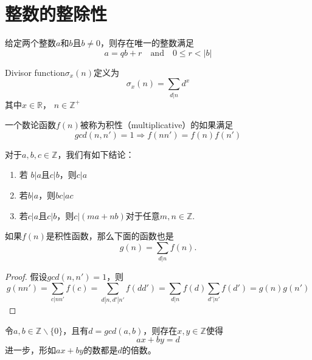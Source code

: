 \section{整数的整除性}
\begin{definition}
	给定两个整数$a$和$b$且$b\neq 0$，则存在唯一的整数满足
	\begin{equation*}
		a = qb+r\quad\text{and}\quad 0\leq r< |b|
	\end{equation*}
\end{definition}
\begin{definition}
	Divisor function$\sigma_x(n)$定义为
	\begin{equation*}
		\sigma_x(n) = \sum\limits_{d|n}d^x
	\end{equation*}
	其中$x\in \mathbb{R}$， $n\in \mathbb Z^+$
\end{definition}
\begin{definition}
	一个数论函数$f(n)$被称为积性（multiplicative）的如果满足
	\begin{equation*}
		gcd(n, n') = 1\Rightarrow f(nn') = f(n)f(n')
	\end{equation*}
\end{definition}
\begin{proposition}
	对于$a, b, c\in \mathbb Z$，我们有如下结论：
	\begin{enumerate}
		\item 若 $b|a$且$c|b$，则$c|a$
		\item 若$b|a$，则$bc|ac$
		\item 若$c|a$且$c|b$，则$c|(ma+nb)$对于任意$m, n\in \mathbb{Z}$.
	\end{enumerate}
\end{proposition}
\begin{proposition}
	如果$f(n)$是积性函数，那么下面的函数也是
	\begin{equation*}
		g(n) = \sum_{d|n}f(n).
	\end{equation*}
\end{proposition}
\begin{proof}
	假设$gcd(n, n')=1$，则
	\begin{equation*}
		g(nn') = \sum_{c|nn'}f(c) = \sum_{d|n, d'|n'}f(dd') = \sum_{d|n}f(d)\sum_{d'|n'}f(d') = g(n)g(n')
	\end{equation*}
\end{proof}
\begin{theorem}[裴蜀定理]
	令$a, b\in \mathbb{Z}\backslash\{0\}$，且有$d = gcd(a, b)$，则存在$x, y\in \mathbb{Z}$使得
	\begin{equation*}
		ax+by = d
	\end{equation*}
	进一步，形如$ax+by$的数都是$d$的倍数。
\end{theorem}
